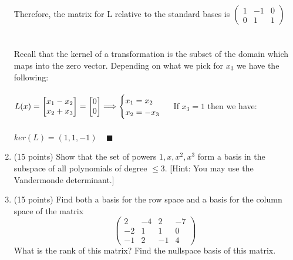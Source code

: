 \documentclass[fleqn]{article}
\begin{document}
\begin{enumerate}
{        \\
        \\
        Therefore, the matrix for L relative to the standard bases is
        $
          \begin{pmatrix}
            1 & -1 & 0
            \\
            0 & 1 & 1
          \end{pmatrix}
        $
        \\
        \\
        \\
        Recall that the kernel of a transformation is the subset of the domain which maps into the zero vector.
        Depending on what we pick for $x_3$ we have the following:
        \\
        \\
        $
          L(x)=\begin{bmatrix}
            x_1-x_2
            \\
            x_2+x_3
          \end{bmatrix}=\begin{bmatrix}
            0
            \\
            0
          \end{bmatrix}
          \Longrightarrow \begin{cases}
            x_1=x_2
            \\
            x_2=-x_3
          \end{cases}
          \\
          \\
        $
        If $x_3=1$ then we have: 
        \\
        \\
        $
          ker(L)=\left(1, 1, -1\right) ~~~~~ \blacksquare
        $
      }

    \item (15 points) Show that the set of powers $1, x, x^2, x^3$ form a basis in the subspace of all polynomials of degree $\leq 3$. 
    [Hint: You may use the Vandermonde determinant.]


    \item (15 points) Find both a basis for the row space and a basis for the column space of the matrix
    $$
      \begin{pmatrix}
        2 & -4 & 2 & -7
        \\
        -2 & 1 & 1 & 0
        \\
        -1 & 2 & -1 & 4
      \end{pmatrix}
    $$
    What is the rank of this matrix? Find the nullspace basis of this matrix.


\end{enumerate}
\end{document}
